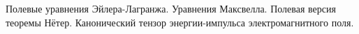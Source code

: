 \documentclass[__main__.tex]{subfiles}
\begin{document}
Полевые уравнения Эйлера-Лагранжа. Уравнения Максвелла. Полевая версия теоремы Нётер. Канонический тензор энергии-импульса электромагнитного поля.\\ 

\end{document}
